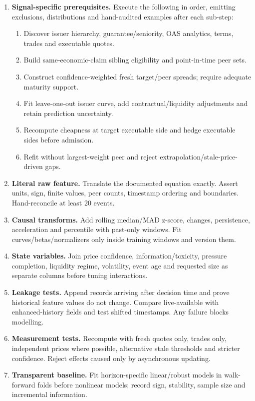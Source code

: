 \documentclass[10pt]{article}
\begin{document}
\begin{enumerate}[leftmargin=2em,label=\textbf{A\arabic*.}]
\item \textbf{Signal-specific prerequisites.} Execute the following in order, emitting exclusions, distributions and hand-audited examples after each sub-step:
\begin{enumerate}[label=\alph*)]
\item Discover issuer hierarchy, guarantee/seniority, OAS analytics, terms, trades and executable quotes.
\item Build same-economic-claim sibling eligibility and point-in-time peer sets.
\item Construct confidence-weighted fresh target/peer spreads; require adequate maturity support.
\item Fit leave-one-out issuer curve, add contractual/liquidity adjustments and retain prediction uncertainty.
\item Recompute cheapness at target executable side and hedge executable sides before admission.
\item Refit without largest-weight peer and reject extrapolation/stale-price-driven gaps.
\end{enumerate}
\item \textbf{Literal raw feature.} Translate the documented equation exactly. Assert units, sign, finite values, peer counts, timestamp ordering and boundaries. Hand-reconcile at least 20 events.
\item \textbf{Causal transforms.} Add rolling median/MAD z-score, changes, persistence, acceleration and percentile with past-only windows. Fit curves/betas/normalizers only inside training windows and version them.
\item \textbf{State variables.} Join price confidence, information/toxicity, pressure completion, liquidity regime, volatility, event age and requested size as separate columns before tuning interactions.
\item \textbf{Leakage tests.} Append records arriving after decision time and prove historical feature values do not change. Compare live-available with enhanced-history fields and test shifted timestamps. Any failure blocks modelling.
\item \textbf{Measurement tests.} Recompute with fresh quotes only, trades only, independent prices where possible, alternative stale thresholds and stricter confidence. Reject effects caused only by asynchronous updating.
\item \textbf{Transparent baseline.} Fit horizon-specific linear/robust models in walk-forward folds before nonlinear models; record sign, stability, sample size and incremental information.

\end{enumerate}
\end{document}
